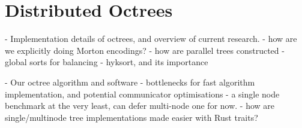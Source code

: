 \section{Distributed Octrees}

- Implementation details of octrees, and overview of current research.
    - how are we explicitly doing Morton encodings?
    - how are parallel trees constructed
        - global sorts for balancing
            - hyksort, and its importance

- Our octree algorithm and software
    - bottlenecks for fast algorithm implementation, and potential communicator optimisations
    - a single node benchmark at the very least, can defer multi-node one for now.
    - how are single/multinode tree implementations made easier with Rust traits?


